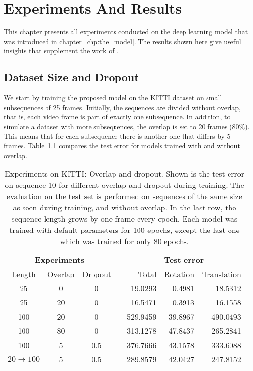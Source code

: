 \chapter{Experiments And Results}\label{chp:experiments-and-results}
	
	This chapter presents all experiments conducted on the deep learning model that was introduced in chapter~\ref{chp:the_model}.
	The results shown here give useful insights that supplement the work of \cite{wang2017deepvo}.
	
	\section{Dataset Size and Dropout}
		We start by training the proposed model on the KITTI dataset on small subsequences of 25 frames. 
		Initially, the sequences are divided without overlap, that is, each video frame is part of exactly one subsequence.
		In addition, to simulate a dataset with more subsequences, the overlap is set to 20 frames (80\%). 
		This means that for each subsequence there is another one that differs by 5 frames.
		Table~\ref{tbl:kitti-overlap-and-dropout} compares the test error for models trained with and without overlap.
		\begin{table}[tb]
			\small
			\begin{center}
				\begin{tabular}{ccccrrr}
					\toprule
					\multicolumn{3}{c}{\textbf{Experiments}}	&	& \multicolumn{3}{c}{\textbf{Test error}} 		\\
					\cmidrule(lr){1-3} 					\cmidrule(lr){5-7}
					Length 			& Overlap 	& Dropout	&	& Total 	& Rotation	& Translation	\\ 
					\midrule
					25				& 0			& 0			& 	& 19.0293	& 0.4981	& 18.5312		\\ 
					25				& 20		& 0			&	& 16.5471	& 0.3913	& 16.1558		\\ 
					100				& 20		& 0			&	& 529.9459	& 39.8967	& 490.0493		\\ 
					100				& 80		& 0			& 	& 313.1278	& 47.8437	& 265.2841		\\ 
					100 			& 5			& 0.5		&	& 376.7666	& 43.1578	& 333.6088		\\ 
					$20\rightarrow100$ 	& 5		& 0.5		&	& 289.8579 	& 42.0427 	& 247.8152 		\\
					\bottomrule
				\end{tabular}
			\end{center}
			\caption[Experiments on KITTI: Overlap and dropout]
					{Experiments on KITTI: Overlap and dropout. 
					 Shown is the test error on sequence 10 for different overlap and dropout during training.
					 The evaluation on the test set is performed on sequences of the same size as seen during training, and without overlap.
					 In the last row, the sequence length grows by one frame every epoch.
					 Each model was trained with default parameters for 100 epochs, except the last one which was trained for only 80 epochs.
					 \label{tbl:kitti-overlap-and-dropout}}
		\end{table}

